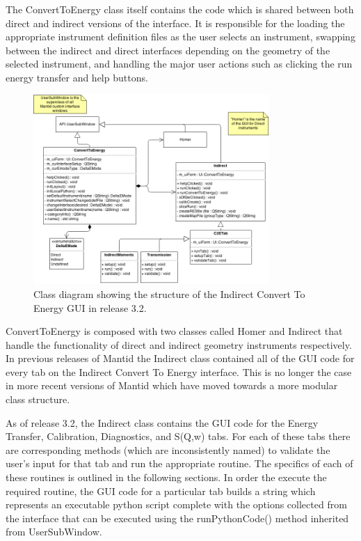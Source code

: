 \documentclass[paper=a4, fontsize=11pt]{scrartcl}	%
\numberwithin{equation}{section}															%
\numberwithin{figure}{section}																%
\numberwithin{table}{section}																%
\begin{document}
The ConvertToEnergy class itself contains the code which is shared between both direct and indirect versions of the interface. It is responsible for the loading the appropriate instrument definition files as the user selects an instrument, swapping between the indirect and direct interfaces depending on the geometry of the selected instrument, and handling the major user actions such as clicking the run energy transfer and help buttons.

\begin{figure}[H]
\centering
\includegraphics[width=0.8\textwidth]{img/uml/class_diagrams/C2E_structure.png}
\caption{Class diagram showing the structure of the Indirect Convert To Energy GUI in release 3.2.}
\label{fig:c2e-class-diagram}
\end{figure}

ConvertToEnergy is composed with two classes called Homer and Indirect that handle the functionality of direct and indirect geometry instruments respectively. In previous releases of Mantid the Indirect class contained all of the GUI code for every tab on the Indirect Convert To Energy interface. This is no longer the case in more recent versions of Mantid which have moved towards a more modular class structure.

As of release 3.2, the Indirect class contains the GUI code for the Energy Transfer, Calibration, Diagnostics, and S(Q,w) tabs. For each of these tabs there are corresponding methods (which are inconsistently named) to validate the user's input for that tab and run the appropriate routine. The specifics of each of these routines is outlined in the following sections. In order the execute the required routine, the GUI code for a particular tab builds a string which represents an executable python script complete with the options collected from the interface that can be executed using the runPythonCode() method inherited from UserSubWindow.
\end{document}
